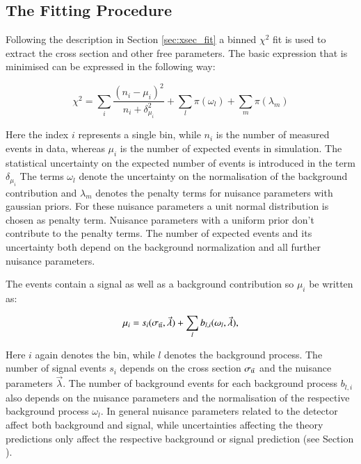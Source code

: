 	
\subsection{The Fitting Procedure}
\label{sec:xsec_stat}

Following the description in Section \ref{sec:xsec_fit} a binned $\chi^2$ fit is used to extract the cross section and other free parameters.
The basic expression that is minimised can be expressed in the following way:

\begin{equation}
  \chi^2  = \sum_{i} \frac{(n_i-\mu_i)^2}{n_i + \delta_{\mu_i}^2} + \sum_{l} \pi(\omega_l) + \sum_{m} \pi(\lambda_m)
\label{eq:xsec_chisqfunct}
\end{equation}

Here the index $i$ represents a single bin, while $n_i$ is the number of measured events in data, whereas $\mu_i$ is the number
of expected events in simulation. The statistical uncertainty on the expected number of events is introduced in the term $\delta_{\mu_i}$ The terms $\omega_l$ denote the uncertainty on the normalisation of the background contribution and $\lambda_m$
denotes the penalty terms for nuisance parameters with gaussian priors. For these nuisance parameters a unit normal distribution is chosen as penalty term. Nuisance parameters with a uniform prior don't contribute to the penalty terms.
The number of expected events and its uncertainty both depend on the background normalization and all further nuisance parameters.

The events contain a signal as well as a background contribution so $\mu_i$ be written as:

\begin{equation}
\mu_i = s_i(\sigma_\mathrm{t\bar{t}},\vec{\lambda}) 
+ \sum_{l} b_{l,i}(\omega_l,\vec{\lambda}),
\label{eq:xsec_expectev}
\end{equation} 

Here $i$ again denotes the bin, while $l$ denotes the background process. The number of signal events $s_i$ depends on the \ttbar cross section $\sigma_\mathrm{t\bar{t}}$ and the nuisance parameters $\vec{\lambda}$.
The number of background events for each background process $b_{l,i}$ also depends on the nuisance parameters and the normalisation of the respective background process $\omega_l$.
In general nuisance parameters related to the detector affect both background and signal, while uncertainties affecting the theory predictions only affect the respective background or signal prediction (see Section ).


